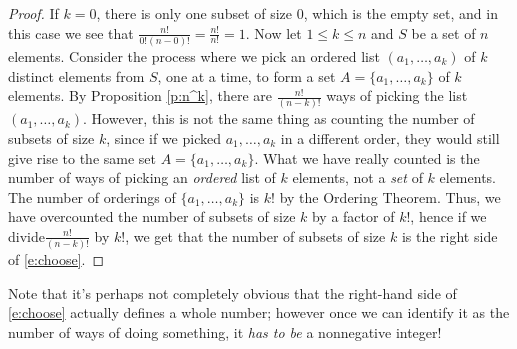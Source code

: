 \documentclass[11pt,dvipsnames]{book}
\numberwithin{figure}{section} %
\numberwithin{table}{section} %
\begin{document}
\begin{proof}
If $k=0$, there is only one subset of size $0$, which is the empty set, and in this case we see that $\frac{n!}{0!(n-0)!}=\frac{n!}{n!}=1$. Now let $1\leq k\leq n$ and $S$ be a set of $n$ elements. Consider the process where we pick an ordered list $(a_{1}, \dots ,a_{k})$ of $k$ distinct elements from $S$, one at a time, to form a set $A=\{a_{1}, \dots ,a_{k}\}$ of $k$ elements. By Proposition \ref{p:n^k}, there are $\frac{n!}{(n-k)!}$ ways of picking the list $(a_{1}, \dots ,a_{k})$. However, this is not the same thing as counting the number of subsets of size $k$, since if we picked $a_1, \dots ,a_k$ in a different order, they would still give rise to the same set $A=\{a_{1}, \dots ,a_{k}\}$. What we have really counted is the number of ways of picking an {\it ordered} list of $k$ elements, not a {\it set} of $k$ elements. The number of orderings of $\{a_{1}, \dots ,a_{k}\}$  is $k!$ by the Ordering Theorem. Thus, we have overcounted the number of subsets of size $k$ by a factor of $k!$, hence if we divide$\frac{n!}{(n-k)!}$ by $k!$, we get that the number of subsets of size $k$ is the right side of \eqref{e:choose}.
\end{proof}
Note that it's perhaps not completely obvious that the right-hand side of \eqref{e:choose} actually defines a whole number; however once we can identify it as the number of ways of doing something, it {\em has to be} a nonnegative integer!
%
%
\end{document}
